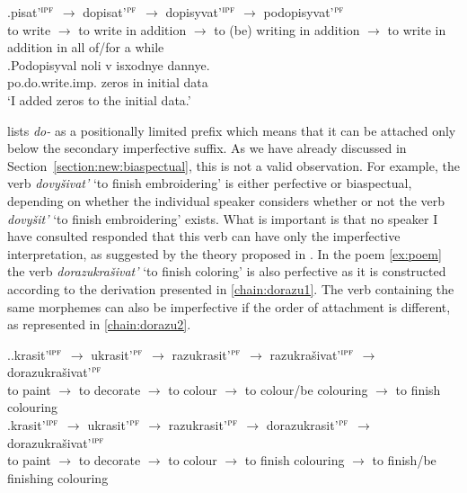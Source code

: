 \exg.\label{chain:podo}pisat'$^{\textsc{ipf}}$ $\rightarrow$ dopisat'$^{\textsc{pf}}$ $\rightarrow$ dopisyvat'$^{\textsc{ipf}}$ $\rightarrow$ podopisyvat'$^{\textsc{pf}}$\\
{to write} $\rightarrow$ {to write in addition} $\rightarrow$ {to (be) writing in addition} $\rightarrow$ {to write in addition in all of/for a while}\\

\exg.\label{ex:podopisyval}Podopisyval noli v isxodnye dannye.\\
po.do.write.imp. zeros in initial data\\
\trans `I added zeros to the initial data.'

\citet{Tatevosov:09} lists \textit{do-}   as a positionally limited prefix  which means that it can be attached only below the secondary imperfective  suffix. As we have already discussed in Section~\ref{section:new:biaspectual}, this is not a valid observation. For example, the verb \textit{dovy\v{s}ivat'} `to finish embroidering' is either perfective or biaspectual, depending on whether the individual speaker considers whether or not the verb \textit{dovy\v{s}it'} `to finish embroidering' exists. What is important is that no speaker I have consulted responded that this verb can have only the imperfective interpretation, as suggested by the theory proposed in \citealt{Tatevosov:09}. In the poem \ref{ex:poem} the verb \textit{dorazukra\v{s}ivat'} `to finish coloring' is also perfective as it is constructed according to the derivation presented in \ref{chain:dorazu1}. The verb containing the same morphemes can also be imperfective if the order of attachment is different, as represented in \ref{chain:dorazu2}.

\ex.\ag.\label{chain:dorazu1}krasit'$^{\textsc{ipf}}$ $\rightarrow$ ukrasit'$^{\textsc{pf}}$ $\rightarrow$ razukrasit'$^{\textsc{pf}}$ $\rightarrow$ razukra\v{s}ivat'$^{\textsc{ipf}}$ $\rightarrow$ dorazukra\v{s}ivat'$^{\textsc{pf}}$\\
{to paint} $\rightarrow$ {to decorate} $\rightarrow$ {to colour} $\rightarrow$ {to colour/be colouring} $\rightarrow$ {to finish colouring}\\
\bg.\label{chain:dorazu2}krasit'$^{\textsc{ipf}}$ $\rightarrow$ ukrasit'$^{\textsc{pf}}$ $\rightarrow$ razukrasit'$^{\textsc{pf}}$ $\rightarrow$ dorazukrasit'$^{\textsc{pf}}$ $\rightarrow$ dorazukra\v{s}ivat'$^{\textsc{ipf}}$\\
{to paint} $\rightarrow$ {to decorate} $\rightarrow$ {to colour} $\rightarrow$ {to finish colouring} $\rightarrow$ {to finish/be finishing colouring}\\

